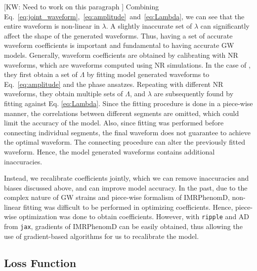 \documentclass[twocolumn]{aastex631}
\newcommand{\ripple}{\texttt{ripple}}
\newcommand{\jax}{\texttt{jax}}
\newcommand{\kw}[1]{{\color{rb4}[KW: #1 ]}}
\begin{document}
\kw{Need to work on this paragraph}
Combining Eq.~\ref{eq:joint_waveform},~\ref{eq:amplitude}~and~\ref{eq:Lambda}, 
we can see that the entire waveform is non-linear in $\lambda$. A slightly 
inaccurate set of $\lambda$ can significantly affect the shape of the generated 
waveforms. Thus, having a set of accurate waveform coefficients is important 
and fundamental to having accurate GW models. Generally, waveform coefficients 
are obtained by calibrating with NR waveforms, which are waveforms computed 
using NR simulations. In the case of \citep{khan2016frequency}, they first 
obtain a set of $\Lambda$ by fitting model generated waveforms to Eq.~\ref{eq:amplitude} 
and the phase ansatzes. Repeating with different NR waveforms, they obtain multiple 
sets of $\Lambda$, and $\lambda$ are subsequently found by fitting against 
Eq. \ref{eq:Lambda}. Since the fitting procedure is done in a piece-wise manner, 
the correlations between different segments are omitted, which could limit the 
accuracy of the model. Also, since fitting was performed before connecting 
individual segments, the final waveform does not guarantee to achieve the optimal 
waveform. The connecting procedure can alter the previously fitted waveform. 
Hence, the model generated waveforms contains additional inaccuracies. 


Instead, we recalibrate coefficients jointly, which we can remove inaccuracies
and biases discussed above, and can improve model accuracy. In the past, due to
the complex nature of GW strains and piece-wise formalism of IMRPhenomD,
non-linear fitting was difficult to be performed in optimizing coefficients.
Hence, piece-wise optimization was done to obtain coefficients. However, with
{\ripple} and AD from \jax, gradients of IMRPhenomD can be easily obtained, thus
allowing the use of gradient-based algorithms for us to recalibrate the model.   

\subsection{Loss Function} \label{subsec:loss}
\end{document}

